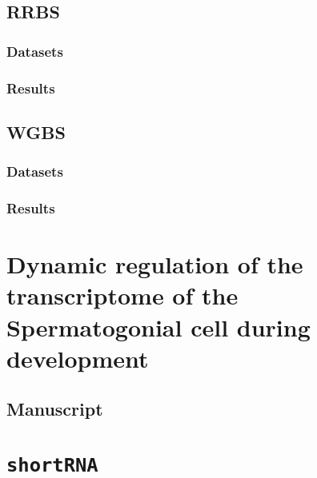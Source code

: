 \documentclass[12pt,twoside]{reedthesis}
\begin{document}
\clearpage

\hypertarget{rrbs}{%
\section{RRBS}\label{rrbs}}

\hypertarget{datasets-3}{%
\subsection{Datasets}\label{datasets-3}}

\hypertarget{results-3}{%
\subsection{Results}\label{results-3}}

\clearpage

\hypertarget{wgbs}{%
\section{WGBS}\label{wgbs}}

\hypertarget{datasets-4}{%
\subsection{Datasets}\label{datasets-4}}

\hypertarget{results-4}{%
\subsection{Results}\label{results-4}}

\hypertarget{dynamic-regulation-of-the-transcriptome-of-the-spermatogonial-cell-during-development}{%
\chapter{Dynamic regulation of the transcriptome of the Spermatogonial cell during development}\label{dynamic-regulation-of-the-transcriptome-of-the-spermatogonial-cell-during-development}}

\hypertarget{manuscript}{%
\section{Manuscript}\label{manuscript}}

\hypertarget{shortrna}{%
\chapter{\texorpdfstring{\texttt{shortRNA}}{shortRNA}}\label{shortrna}}
\end{document}
